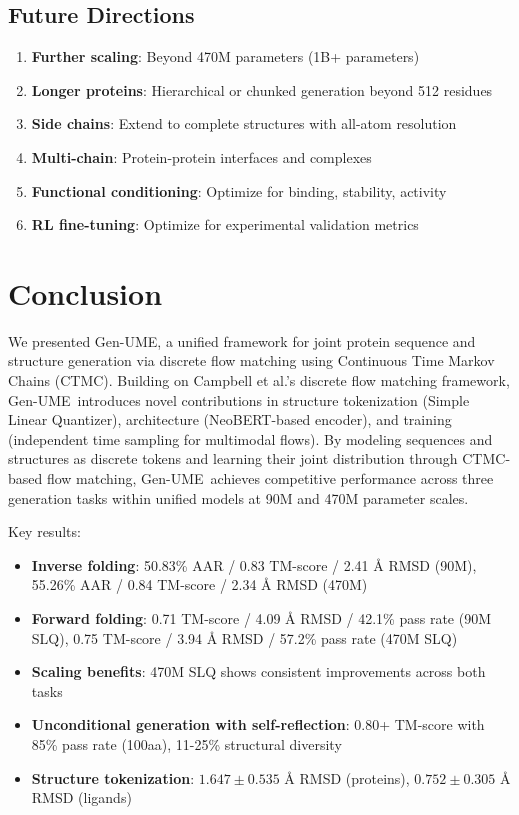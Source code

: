 \documentclass[11pt,a4paper]{article}
\newcommand{\genume}{Gen-UME}
\begin{document}
\subsection{Future Directions}

\begin{enumerate}
\item \textbf{Further scaling}: Beyond 470M parameters (1B+ parameters)
\item \textbf{Longer proteins}: Hierarchical or chunked generation beyond 512 residues
\item \textbf{Side chains}: Extend to complete structures with all-atom resolution
\item \textbf{Multi-chain}: Protein-protein interfaces and complexes
\item \textbf{Functional conditioning}: Optimize for binding, stability, activity
\item \textbf{RL fine-tuning}: Optimize for experimental validation metrics
\end{enumerate}

\section{Conclusion}

We presented \genume, a unified framework for joint protein sequence and structure generation via discrete flow matching using Continuous Time Markov Chains (CTMC). Building on Campbell et al.'s \cite{campbell2024} discrete flow matching framework, \genume~introduces novel contributions in structure tokenization (Simple Linear Quantizer), architecture (NeoBERT-based encoder), and training (independent time sampling for multimodal flows). By modeling sequences and structures as discrete tokens and learning their joint distribution through CTMC-based flow matching, \genume~achieves competitive performance across three generation tasks within unified models at 90M and 470M parameter scales.

Key results:
\begin{itemize}
\item \textbf{Inverse folding}: 50.83\% AAR / 0.83 TM-score / 2.41 Å RMSD (90M), 55.26\% AAR / 0.84 TM-score / 2.34 Å RMSD (470M)
\item \textbf{Forward folding}: 0.71 TM-score / 4.09 Å RMSD / 42.1\% pass rate (90M SLQ), 0.75 TM-score / 3.94 Å RMSD / 57.2\% pass rate (470M SLQ)
\item \textbf{Scaling benefits}: 470M SLQ shows consistent improvements across both tasks
\item \textbf{Unconditional generation with self-reflection}: 0.80+ TM-score with 85\% pass rate (100aa), 11-25\% structural diversity
\item \textbf{Structure tokenization}: $1.647 \pm 0.535$ Å RMSD (proteins), $0.752 \pm 0.305$ Å RMSD (ligands)
\end{itemize}
\end{document}
